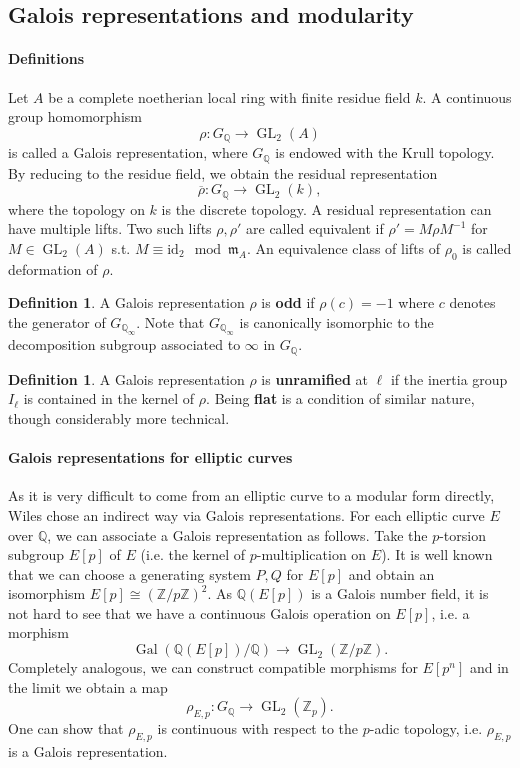 \documentclass{article}
\theoremstyle{plain}%
\theoremstyle{definition}
\newtheorem{definition}[theorem]{Definition}
\theoremstyle{remark}
\newcommand{\GL}{\operatorname{GL}}
\begin{document}
\subsection{Galois representations and modularity}

\paragraph{Definitions}
Let \(A\) be a complete noetherian local ring with finite residue field \(k\).
A continuous group homomorphism
\[
    \rho\colon G_\mathbb{Q} \to \GL_2(A)
\]
is called a Galois representation, where \(G_\mathbb{Q}\) is endowed with the Krull topology.
By reducing to the residue field, we obtain the residual representation
\[
    \overline{\rho}\colon G_\mathbb{Q} \to \GL_2(k),
\]
where the topology on \(k\) is the discrete topology.
A residual representation can have multiple lifts. Two such lifts \(\rho, \rho'\) are called equivalent
if \(\rho' = M\rho M^{-1}\) for \(M \in \GL_2(A)\) s.t. \(M \equiv \mathrm{id}_{2} \mod \mathfrak{m}_A\).
An equivalence class of lifts of \(\rho_0\) is called deformation of \(\rho\).

\begin{definition}
    A Galois representation \(\rho\) is \textbf{odd} if \(\rho(c) = -1\) where \(c\) denotes the generator
    of \(G_{\mathbb{Q}_\infty}\). Note that \(G_{\mathbb{Q}_\infty}\) is canonically isomorphic to
    the decomposition subgroup associated to \(\infty\) in \(G_\mathbb{Q}\).
\end{definition}
\begin{definition}
    A Galois representation \(\rho\) is \textbf{unramified} at \(\ell\) if the inertia group
    \(I_\ell\) is contained in the kernel of \(\rho\).
    Being \textbf{flat} is a condition of similar nature, though considerably more technical.
\end{definition}

\paragraph{Galois representations for elliptic curves}
As it is very difficult to come from an elliptic curve to a modular form directly, 
Wiles chose an indirect way via Galois representations.
For each elliptic curve \(E\) over \(\mathbb{Q}\), we can associate a Galois representation as follows.
Take the \(p\)-torsion subgroup \(E[p]\) of \(E\) (i.e. the kernel of \(p\)-multiplication on \(E\)).
It is well known that we can choose a generating system \(P, Q\) for \(E[p]\) and 
obtain an isomorphism \(E[p] \cong (\mathbb{Z}/p \mathbb{Z})^2\).
As \(\mathbb{Q}(E[p])\) is a Galois number field, it is not hard to see that we have
a continuous Galois operation on \(E[p]\), i.e. a morphism
\[
    \operatorname{Gal}(\mathbb{Q}(E[p])/\mathbb{Q}) \to \GL_2(\mathbb{Z}/p\mathbb{Z}).  
\]
Completely analogous, we can construct compatible morphisms for \(E[p^n]\) 
and in the limit we obtain a map
\[
    \rho_{E, p} \colon G_\mathbb{Q} \to \GL_2(\mathbb{Z}_p).
\]
One can show that \(\rho_{E,p}\) is continuous with respect to the \(p\)-adic topology,
i.e. \(\rho_{E,p}\) is a Galois representation.
\end{document}
